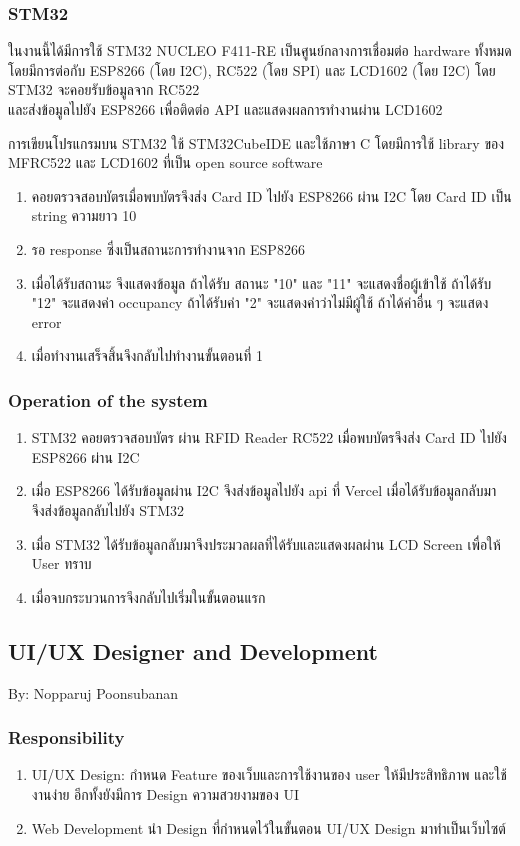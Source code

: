 \documentclass[fontsize=14pt]{extarticle}
\begin{document}
\subsubsection{STM32}
\par ในงานนี้ได้มีการใช้ STM32 NUCLEO F411-RE เป็นศูนย์กลางการเชื่อมต่อ hardware ทั้งหมด โดยมีการต่อกับ ESP8266 (โดย I2C), RC522 (โดย SPI) และ LCD1602 (โดย I2C) 
โดย STM32 จะคอยรับข้อมูลจาก RC522 \\และส่งข้อมูลไปยัง ESP8266 เพื่อติดต่อ API และแสดงผลการทำงานผ่าน LCD1602\\
\par การเขียนโปรแกรมบน STM32 ใช้ STM32CubeIDE และใช้ภาษา C โดยมีการใช้ library ของ MFRC522 และ LCD1602 ที่เป็น open source software
\begin{enumerate}
    \item คอยตรวจสอบบัตรเมื่อพบบัตรจึงส่ง Card ID ไปยัง ESP8266 ผ่าน I2C โดย Card ID เป็น string ความยาว 10
    \item รอ response ซึ่งเป็นสถานะการทำงานจาก ESP8266
    \item เมื่อได้รับสถานะ จึงแสดงข้อมูล ถ้าได้รับ สถานะ "10" และ "11" จะแสดงชื่อผู้เข้าใช้ ถ้าได้รับ "12" จะแสดงค่า occupancy ถ้าได้รับค่า "2" จะแสดงค่าว่าไม่มีผู้ใช้ ถ้าได้ค่าอื่น ๆ จะแสดง error
    \item เมื่อทำงานเสร็จสิ้นจึงกลับไปทำงานขั้นตอนที่ 1
\end{enumerate}
\subsubsection{Operation of the system}
\begin{enumerate}
    \item STM32 คอยตรวจสอบบัตร  ผ่าน RFID Reader RC522 เมื่อพบบัตรจึงส่ง Card ID ไปยัง ESP8266 ผ่าน I2C
    \item เมื่อ ESP8266 ได้รับข้อมูลผ่าน I2C จึงส่งข้อมูลไปยัง api ที่ Vercel เมื่อได้รับข้อมูลกลับมา จึงส่งข้อมูลกลับไปยัง STM32
    \item เมื่อ STM32 ได้รับข้อมูลกลับมาจึงประมวลผลที่ได้รับและแสดงผลผ่าน LCD Screen เพื่อให้ User ทราบ
    \item เมื่อจบกระบวนการจึงกลับไปเริ่มในขั้นตอนแรก
\end{enumerate}
\pagebreak
\subsection{UI/UX Designer and Development}
By: Nopparuj Poonsubanan
\subsubsection{Responsibility}
\begin{enumerate}
    \item UI/UX Design: กำหนด Feature ของเว็บและการใช้งานของ user ให้มีประสิทธิภาพ และใช้งานง่าย อีกทั้งยังมีการ Design ความสวยงามของ UI
    \item Web Development นำ Design ที่กำหนดไว้ในขั้นตอน UI/UX Design มาทำเป็นเว็บไซต์
\end{enumerate}
\end{document}
